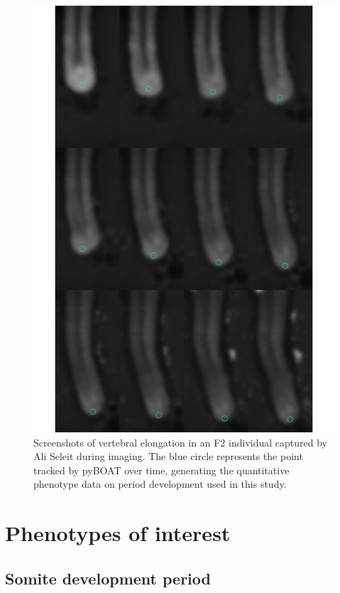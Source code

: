 \documentclass[
]{book}
\begin{document}
\begin{figure}
\includegraphics[width=1\linewidth]{figs/somites/ali_compiled_somite_elong} \caption{Screenshots of vertebral elongation in an F2 individual captured by Ali Seleit during imaging. The blue circle represents the point tracked by pyBOAT over time, generating the quantitative phenotype data on period development used in this study.}\label{fig:somite-period-ali}
\end{figure}

\hypertarget{somite-phenotype}{%
\section{Phenotypes of interest}\label{somite-phenotype}}

\hypertarget{somite-development-period}{%
\subsection{Somite development period}\label{somite-development-period}}
\end{document}
